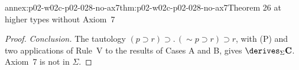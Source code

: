 \begin{annexitem}{annex:p02-w02c-p02-028-no-ax7}{thm:p02-w02c-p02-028-no-ax7}{Theorem 26 at higher types without Axiom~7}
\begin{proof}
\emph{Conclusion.}  The tautology
\((p\supset r)\supset.\,(\sim p\supset r)\supset r\), with (P) and two
applications of Rule~V to the results of Cases A and B, gives
\(\derives_\Sigma\mathbf C\).  Axiom~7 is not in \(\Sigma\).
\end{proof}
\end{annexitem}
